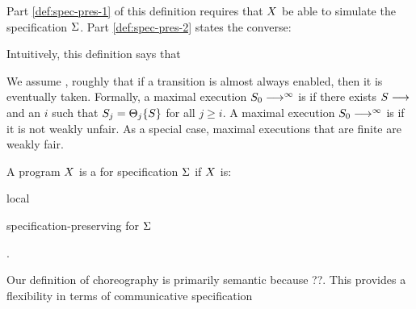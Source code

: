 




Part \cref{def:spec-pres-1} of this definition requires that $X$ be able to simulate the specification $\Sigma$.
Part \cref{def:spec-pres-2} states the converse: 










Intuitively, this definition says that 

We assume , roughly that if a transition is almost always enabled, then it is eventually taken.
Formally, a maximal execution $S_0 \trans[\infty]$ is  if there exists $S \trans$ and an $i$ such that $S_j = \omatch[_j]{S}$ for all $j \geq i$.
A maximal execution $S_0 \trans[\infty]$ is  if it is not weakly unfair.
As a special case, maximal executions that are finite are weakly fair.




\begin{definition}[Choreography]
  A program $X$ is a  for specification $\Sigma$ if $X$ is:
  \begin{enumerate*}[label=\textit{\alph*)}, itemjoin={{, }}, itemjoin*={{, and }}]
  \item local
  \item specification-preserving for $\Sigma$
  \end{enumerate*}.
\end{definition}

Our definition of choreography is primarily semantic because {??}.
This provides a flexibility in terms of 
communicative specification


